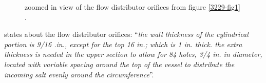 \documentclass{article}
\newcommand*{\mrsarchive}{../../msr-archive}%
\begin{document}
\begin{figure}[H]
  \centering
  \caption{zoomed in view of the flow distributor orifices from figure \ref{3229-fig1} \parencite[figure 1]{ornl-tm-3229}.}
  \label{3229-fig1-zoom}
\end{figure}

\parencite[page 108]{ornl-tm-0728} states about the flow distributor orifices:
\enquote{\textit{the wall thickness of the cylindrical portion is 9/16 .in., except for the top 16 in.; which is 1 in. thick. the extra thickness is needed in the upper section to allow for 84 holes, 3/4 in. in diameter, located with variable spacing around the top of the vessel to distribute the incoming salt evenly around the circumference}}. \\
\end{document}
